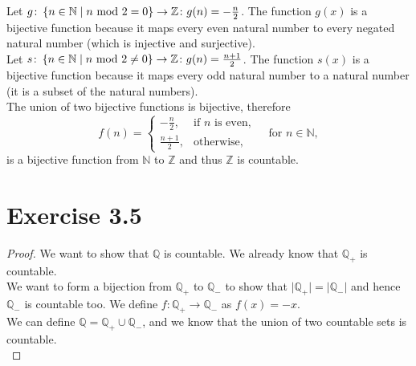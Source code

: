\documentclass{article} %
\newcommand{\homeworkNumber}{3}
\begin{document}
Let \( g \colon \left\{ n \in \mathbb{N} \mid n \text{ mod } 2 = 0 \\ \right\} \to \mathbb{Z} \colon g(n) = -\frac{n}{2} \).
The function \( g(x) \) is a bijective function because it maps every
even natural number to every negated natural number (which is injective and surjective). \\
Let \( s \colon \left\{ n \in \mathbb{N} \mid n \text{ mod } 2 \neq  0 \\ \right\} \to \mathbb{Z} \colon g(n) = \frac{n+1}{2} \).
The function \( s(x) \) is a bijective function because it maps every odd natural number to a natural number
(it is a subset of the natural numbers). \\
The union of two bijective functions is bijective, therefore
\begin{equation*}
	f(n) =
	\begin{cases}
		-\frac{n}{2},  & \text{if } n \text{ is even}, \\
		\frac{n+1}{2}, & \text{otherwise},
	\end{cases}
	\quad \text{for } n \in \mathbb{N},
\end{equation*}
is a bijective function from \( \mathbb{N} \) to \( \mathbb{Z} \) and thus \( \mathbb{Z} \) is countable.


\section*{Exercise \homeworkNumber.5}
\begin{proof}
	We want to show that $\mathbb Q$ is countable. We already know that $\mathbb Q_+$ is countable. \\
	We want to form a bijection from $\mathbb Q_+$ to $\mathbb Q_-$ to show that $\lvert \mathbb Q_+ \lvert = \lvert \mathbb Q_- \lvert$ and hence $\mathbb Q_-$ is countable too.
	We define $f:\mathbb Q_+ \rightarrow \mathbb Q_-$ as $f(x) = -x$. \\
	We can define $\mathbb Q = \mathbb Q_+ \cup \mathbb Q_-$, and we know that the union of two countable sets is countable. \\
\end{proof}
\end{document}

